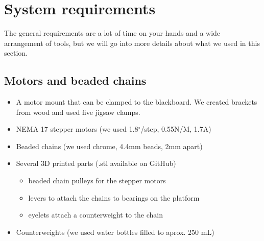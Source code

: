 \documentclass[a4paper,10pt]{article}
\begin{document}

\section{System requirements}
\label{sec:sysreq}
The general requirements are a lot of time on your hands and a wide
arrangement of tools, but we will go into more details about what
we used in this section.

\subsection*{Motors and beaded chains}
\begin{itemize}
  \item A motor mount that can be clamped to the blackboard. We created brackets from wood and used five jigsaw clamps.
  \item NEMA 17 stepper motors (we used 1.8$^\circ$/step, 0.55N/M, 1.7A)
  \item Beaded chains (we used chrome, 4.4mm beads, 2mm apart)
  \item Several 3D printed parts (.stl available on GitHub)
  \begin{itemize}
    \item beaded chain pulleys for the stepper motors
    \item levers to attach the chains to bearings on the platform
    \item eyelets attach a counterweight to the chain
  \end{itemize}
  \item Counterweights (we used water bottles filled to aprox. 250 mL)
\end{itemize}
\end{document}
